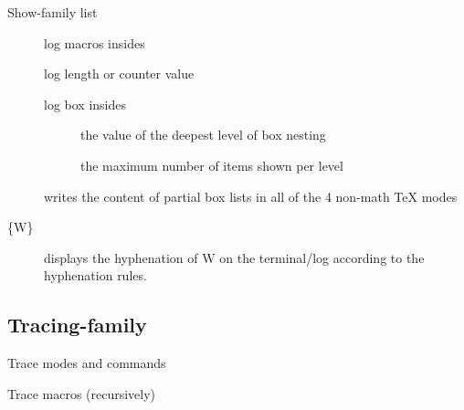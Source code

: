 \begin{frame}{Show-family list}\relax
\small
\begin{description}
    \item[\ccol{\show}] log macros insides
    \item[\ccol\showthe] log length or counter value
    \item[\ccol\showbox] log box insides 
    \begin{description}
        \item[\ccol\showboxdepth] the value of the deepest level of box nesting
        \item[\ccol\showboxbreadth] the maximum number of items shown per level 
    \end{description}
    \item[\ccol\showlists] writes the content of partial box lists in all of the 4 non-math TeX modes
    \item[\ccol\showhyphens\{W\}] displays the hyphenation of W on the terminal/log according to the hyphenation rules.
\end{description}
\end{frame}

\subsection{Tracing-family}

\begin{frame}[fragile]{Trace modes and commands\tW\magicPage}\relax
{}

\end{frame}

\begin{frame}[fragile]{Trace macros (recursively)\tW\magicPage}\relax
{}

\end{frame}


